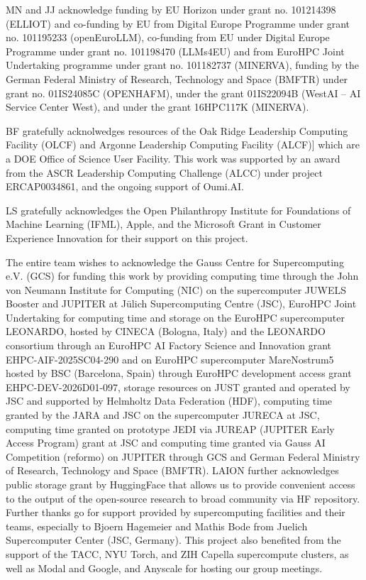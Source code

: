 \documentclass{llmxive}
\begin{document}
\begin{ack}
\label{sec:acknowledgements}

MN and JJ acknowledge funding by EU Horizon under grant no. 101214398 (ELLIOT) and co-funding by EU from Digital Europe Programme under grant no. 101195233 (openEuroLLM), co-funding from EU under Digital Europe Programme under grant no. 101198470 (LLMs4EU) and from EuroHPC Joint Undertaking programme under grant no. 101182737 (MINERVA), funding by the German Federal Ministry of Research, Technology and Space (BMFTR) under grant no. 01IS24085C (OPENHAFM), under the grant 01IS22094B (WestAI -- AI Service Center West), and under the grant 16HPC117K (MINERVA).

BF gratefully acknolwedges resources of the Oak Ridge Leadership Computing Facility (OLCF) and Argonne Leadership Computing Facility (ALCF)] which are a DOE Office of Science User Facility. This work was supported by an award from the ASCR Leadership Computing Challenge (ALCC) under project ERCAP0034861, and the ongoing support of Oumi.AI.

LS gratefully acknowledges the Open Philanthropy Institute for Foundations of Machine Learning (IFML), Apple, and the Microsoft Grant in Customer Experience Innovation for their support on this project.

The entire team wishes to acknowledge the Gauss Centre for Supercomputing e.V. (GCS) for funding this work by providing computing time through the John von Neumann Institute for Computing (NIC) on the supercomputer JUWELS Booster and JUPITER at J\"ulich Supercomputing Centre (JSC), EuroHPC Joint Undertaking for computing time and storage on the EuroHPC supercomputer LEONARDO, hosted by CINECA (Bologna, Italy) and the LEONARDO consortium through an EuroHPC AI Factory Science and Innovation grant EHPC-AIF-2025SC04-290 and on EuroHPC supercomputer MareNostrum5 hosted by BSC (Barcelona, Spain) through EuroHPC development access grant EHPC-DEV-2026D01-097, storage resources on JUST granted and operated by JSC and supported by Helmholtz Data Federation (HDF), computing time granted by the JARA and JSC on the supercomputer JURECA at JSC, computing time granted on prototype JEDI via JUREAP (JUPITER Early Access Program) grant at JSC and computing time granted via Gauss AI Competition (reformo) on JUPITER through GCS and German Federal Ministry of Research, Technology and Space (BMFTR). LAION further acknowledges public storage grant by HuggingFace that allows us to provide convenient access to the output of the open-source research to broad community via HF repository. Further thanks go for support provided by supercomputing facilities and their teams, especially to Bjoern Hagemeier and Mathis Bode from Juelich Supercomputer Center (JSC, Germany). This project also benefited from the support of the TACC, NYU Torch, and ZIH Capella supercompute clusters, as well as Modal and Google, and Anyscale for hosting our group meetings. 


\end{ack}
\end{document}
